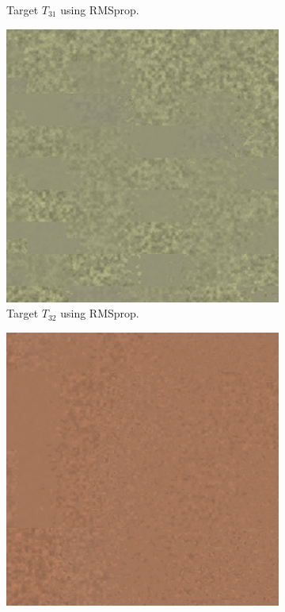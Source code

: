 \begin{figure}
\begin{subfigure}[t]{.25\textwidth}
    \caption{Target $T_{31}$ using RMSprop.}
    \label{fig:M3SBLFinalRendersTwoParamRMSprop}
\end{subfigure}\hspace{0.7cm}
\begin{subfigure}[t]{.25\textwidth}
    \centering
    \includegraphics[width=\linewidth]{img/evaluation/M3/random/SBL_RMSprop_random_final.png}
    \caption{Target $T_{32}$ using RMSprop.}
    \label{fig:M3SBLFinalRendersRandomRMSprop}
\end{subfigure}\hspace{0.7cm}
\begin{subfigure}[t]{.25\textwidth}
    \centering
\includegraphics[width=\linewidth]{img/evaluation/M3/real life/SBL_RMSprop_real_life_final.png}

\end{subfigure}
\end{figure}
